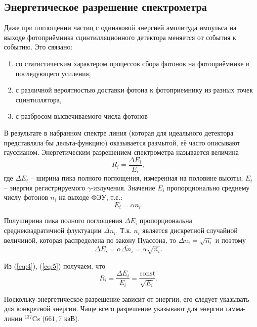 \documentclass[a4paper]{article}
\begin{document}
\subsection{Энергетическое разрешение спектрометра} Даже при поглощении частиц с одинаковой энергией амплитуда импульса на выходе фотоприёмника сцинтилляционного детектора меняется от события к событию. Это связано:
\begin{enumerate}
\item со статистическим характером процессов сбора фотонов на фотоприёмнике и последующего усиления,
\item с различной вероятностью доставки фотона к фотоприемнику из разных точек сцинтиллятора,
\item с разбросом высвечиваемого числа фотонов
\end{enumerate}

\noindent В результате в набранном спектре линия (которая для идеального детектора представляла бы дельта-функцию) оказывается размытой, её часто описывают гауссианом. Энергетическим разрешением спектрометра называется величина
\begin{equation}
R_i=\frac{\Delta E_i}{E_i},
\end{equation}
где $\Delta E_i$ -- ширина пика полного поглощения, измеренная на половине высоты, $E_i$ -- энергия регистрируемого $\gamma$-излучения. Значение $E_i$ пропорционально среднему числу фотонов $\overline{n_i}$ на выходе ФЭУ, т.е.:
\begin{equation}
E_i=\alpha\overline{n_i}.
\label{eq:4}
\end{equation}

\noindent Полуширина пика полного поглощения $\Delta E_i$ пропорциональна среднеквадратичной флуктуации $\overline{\Delta n_i}$. Т.к. $n_i$ является дискретной случайной величиной, которая распределена по закону Пуассона, то $\overline{\Delta n_i}=\sqrt{\overline{n_i}}$ и поэтому
\begin{equation}
\Delta E_i=\alpha\overline{\Delta n_i}=\alpha\sqrt{\overline{n_i}}.
\label{eq:5}
\end{equation}

\noindent Из (\ref{eq:4}), (\ref{eq:5}) получаем, что
\begin{equation}
R_i=\frac{\Delta E_i}{E_i}=\frac{\text{const}}{\sqrt{E_i}}.
\label{eq:6}
\end{equation}

\noindent Поскольку энергетическое разрешение зависит от энергии, его следует указывать для конкретной энергии. Чаще всего разрешение указывают для энергии гамма-линии $^{137}\text{Cs}$ ($661,7$ кэВ).
\end{document}
